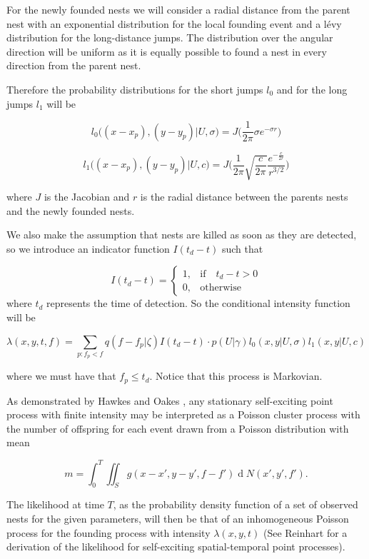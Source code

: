 \documentclass[11pt,a4paper]{article}
\renewcommand{\d}[1]{\ensuremath{\operatorname{d}\!{#1}}}
\begin{document}
For the newly founded nests we will consider a radial distance from the parent nest with an exponential distribution for the local founding event and a {\color{red}l\'evy distribution for the long-distance jumps}. The distribution over the angular direction will be uniform as it is equally possible to found a nest in every direction from the parent nest. {\color{red} Therefore the probability distributions for the short jumps $l_0$ and for the long jumps $l_1$ will be

\begin{equation*}
    l_0\Big((x - x_p), (y - y_p) | U, \sigma \Big)= J \bigg(\frac{1}{2 \pi} \sigma e^{- \sigma r}\bigg)
\end{equation*}

\begin{equation*}
    l_1\Big((x - x_p), (y - y_p) | U, c \Big)= J \bigg(\frac{1}{2 \pi} \sqrt{\frac{c}{2 \pi}} \frac{e^{- \frac{c}{ 2 r}}}{r^{3/2}}\bigg)
\end{equation*}}
where $J$ is the Jacobian and $r$ is the radial distance between the parents nests and the newly founded nests.

We also make the assumption that nests are killed as soon as they are detected, so we introduce an indicator function $I(t_d - t)$ such that

\begin{equation*}
    I (t_d - t) =
    \begin{cases}
        1, & \mbox{if} \quad t_d -  t> 0 \\
        0, & \mbox{otherwise}
    \end{cases}
\end{equation*}
where $t_d$ represents the time of detection. So the conditional intensity function will be

\begin{equation*}
    \lambda(x, y, t, f) = \sum_{p:f_p < f} q(f - f_p | \zeta) I(t_d - t)\cdot p(U | \gamma) l_0(x, y | U, \sigma) l_1(x, y | U, c)
\end{equation*}
{\color{red} where we must have that $f_p\leq t_d$. Notice that this process is Markovian.

As demonstrated by Hawkes and Oakes \cite{Hawkes74}, any stationary self-exciting point process with finite intensity may be interpreted as a Poisson cluster process with the number of offspring for each event drawn from a Poisson distribution with mean 

\begin{equation} \label{eq:NumOffsp}
    m = \int_0^T \iint_S g(x-x', y-y', f-f')\d N(x', y', f').
\end{equation}}
The likelihood at time $T$, {\color{red}as the probability density function of a set of observed nests for the given parameters,} will then be that of an inhomogeneous Poisson process for the founding process with intensity $\lambda(x, y, t)$ {\color{red} (See Reinhart \cite{Reinhart} for a derivation of the likelihood for self-exciting spatial-temporal point processes).}
\end{document}
